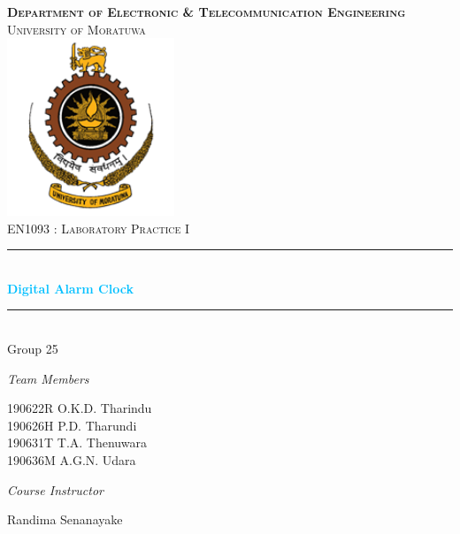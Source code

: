\newcommand{\HRule}{\rule{\linewidth}{0.5mm}} 

\begin{titlepage}
\center
\textsc{
\Huge \textbf{Department of Electronic \& Telecommunication Engineering}\\[.5cm]
\Large
University of Moratuwa\\[1.5cm] 
\includegraphics[width=5cm]{Picture1.png}\\[2cm]
EN1093 : Laboratory Practice I}\\[1.5cm] 


\sffamily
\HRule \\[0.4cm]
\textbf{\Huge\textcolor{deepskyblue}{Digital Alarm Clock}}\\[0.2cm] 
\HRule \\[1cm]
 \Large
Group 25\\[5mm]
\large
\begin{minipage}[t]{.5\textwidth}
\begin{flushleft}
\emph{ \Large Team Members}

\large 190622R \quad O.K.D. Tharindu\\
\large 190626H \quad P.D. Tharundi \\
\large 190631T \quad T.A. Thenuwara\\
\large 190636M \quad A.G.N. Udara\\
\end{flushleft}

\end{minipage}\hfill\begin{minipage}[t]{.4\textwidth}

\begin{flushright}
\emph{ \Large Course Instructor} 

Randima Senanayake\\ 

\end{flushright}
\end{minipage}
\end{titlepage}

